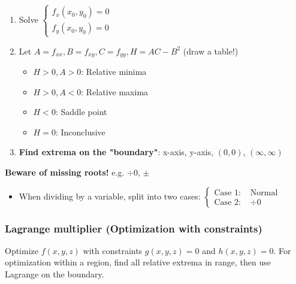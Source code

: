 \begin{mdframed}[style=theorem]
	\begin{enumerate}
		\item Solve $\begin{cases}f_x(x_0, y_0) = 0 \\ f_y(x_0, y_0) = 0\end{cases}$
		\item Let $A = f_{xx}, B = f_{xy}, C = f_{yy}, H = AC - B^2$ (draw a table!)
		\vspace{-0.5cm}
		\begin{multicols}{2}
			\begin{itemize}
				\item $H > 0, A > 0$: Relative minima
				\item $H > 0, A < 0$: Relative maxima
				\item $H < 0$: Saddle point
				\item $H = 0$: Inconclusive
			\end{itemize}
		\end{multicols}
		\vspace{-0.5cm}
		\item \textbf{Find extrema on the "boundary"}: x-axis, y-axis, $(0, 0)$, $(\infty, \infty)$
	\end{enumerate}
	\textbf{Beware of missing roots!} e.g. $\div 0$, $\pm$
	\begin{itemize}
		\item When dividing by a variable, split into two cases: $\begin{cases}\text{Case 1: } &\text{Normal}\\ \text{Case 2: } &\div 0\end{cases}$
	\end{itemize}
\end{mdframed}

\columnbreak

\subsubsection*{Lagrange multiplier (Optimization with constraints)}
Optimize $f(x, y, z)$ with constraints $g(x, y, z)=0$ and $h(x, y, z)=0$. For optimization within a region, find all relative extrema in range, then use Lagrange on the boundary.


